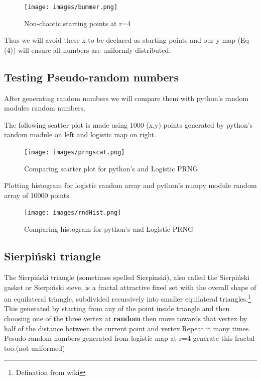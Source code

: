 \documentclass{report}
\begin{document}
\begin{figure}[!h]
    \centering
    \texttt{[image: images/bummer.png]}
    \caption{Non-chaotic starting points at r=4}
    \label{fig:my_label8}
\end{figure}

Thus we will avoid these x to be declared as starting points and our y map (Eq (4)) will ensure all numbers are uniformly distributed.
\newpage
\subsection{Testing Pseudo-random numbers}
After generating random numbers we will compare them with python's random modules random numbers.

The following scatter plot is made using 1000 (x,y) points generated by python's random module on left and logistic map on right.

\begin{figure}[!h]
    \centering
    \texttt{[image: images/prngscat.png]}
    \caption{Comparing scatter plot for python's and Logistic PRNG}
    \label{fig:my_label9}
\end{figure}

Plotting histogram for logistic random array and python's numpy module random array of 10000 points.

\begin{figure}[!h]
    \centering
    \texttt{[image: images/rndHist.png]}
    \caption{Comparing histogram for python's and Logistic PRNG}
    \label{fig:my_label10}
\end{figure}
\newpage

\subsection{Sierpiński triangle}
The Sierpiński triangle (sometimes spelled Sierpinski), also called the Sierpiński gasket or Sierpiński sieve, is a fractal attractive fixed set with the overall shape of an equilateral triangle, subdivided recursively into smaller equilateral triangles.\footnote[1]{Defination from wiki}
\newline
This generated by starting from any of the point inside triangle and then choosing one of the three vertex at \textbf{random} then move towards that vertex by half of the distance between the current point and vertex.Repeat it many times.
Pesudo-random numbers generated from logistic map at r=4 generate this fractal too.(not uniformed)
\end{document}
